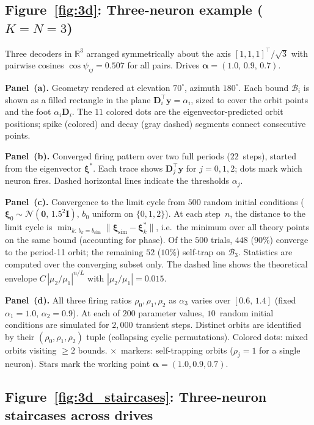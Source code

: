 \documentclass[12pt]{article}
\newcommand{\vv}[1]{\mathbf{#1}}
\newcommand{\DD}{\vv{D}}
\newcommand{\yy}{\vv{y}}
\newcommand{\xxi}{\boldsymbol{\xi}}
\newcommand{\RR}{\mathbb{R}}
\newcommand{\Bsp}{\mathcal{B}}
\begin{document}
\subsection{Figure~\ref{fig:3d}: Three-neuron example ($K{=}N{=}3$)}\label{app:fig-3d}

Three decoders in $\RR^3$ arranged symmetrically about the axis
$[1,1,1]^\top/\sqrt{3}$ with pairwise cosines
$\cos\psi_{ij}=0.507$ for all pairs.  Drives
$\boldsymbol{\alpha}=(1.0,\,0.9,\,0.7)$.

\textbf{Panel~(a).}
Geometry rendered at elevation $70^\circ$, azimuth $180^\circ$.
Each bound $\Bsp_i$ is shown as a filled rectangle in the plane
$\DD_i^\top\yy=\alpha_i$, sized to cover the orbit points and
the foot $\alpha_i\DD_i$.  The $11$ colored dots are the
eigenvector-predicted orbit positions; spike (colored) and decay
(gray dashed) segments connect consecutive points.

\textbf{Panel~(b).}
Converged firing pattern over two full periods ($22$~steps), started
from the eigenvector $\xxi^*$.  Each trace shows
$\DD_j^\top\yy$ for $j=0,1,2$; dots mark which neuron fires.
Dashed horizontal lines indicate the thresholds $\alpha_j$.

\textbf{Panel~(c).}
Convergence to the limit cycle from $500$ random initial conditions
($\xxi_0\sim\mathcal{N}(\mathbf{0},\,1.5^2\vv{I})$, $b_0$ uniform on
$\{0,1,2\}$).  At each step~$n$, the distance to the limit cycle is
$\min_{k:\,b_k=b_{\text{sim}}} \|\xxi_{\text{sim}}-\xxi_k^*\|$,
i.e.\ the minimum over all theory points on the same bound
(accounting for phase).  Of the $500$ trials, $448$ ($90\%$) converge
to the period-11 orbit; the remaining $52$ ($10\%$) self-trap on
$\Bsp_3$.  Statistics are computed over the converging subset only.
The dashed line shows the theoretical envelope
$C\,|\mu_2/\mu_1|^{n/L}$ with $|\mu_2/\mu_1|=0.015$.

\textbf{Panel~(d).}
All three firing ratios $\rho_0,\rho_1,\rho_2$ as $\alpha_3$ varies
over $[0.6,\,1.4]$ (fixed $\alpha_1=1.0$, $\alpha_2=0.9$).  At each
of $200$ parameter values, $10$~random initial conditions are
simulated for $2{,}000$ transient steps.  Distinct orbits are
identified by their $(\rho_0,\rho_1,\rho_2)$ tuple (collapsing cyclic
permutations).  Colored dots: mixed orbits visiting $\geq 2$ bounds.
$\times$~markers: self-trapping orbits ($\rho_j=1$ for a single
neuron).  Stars mark the working point $\boldsymbol{\alpha}=(1.0,0.9,0.7)$.

\subsection{Figure~\ref{fig:3d_staircases}: Three-neuron staircases across drives}\label{app:fig-3d-staircases}
\end{document}
